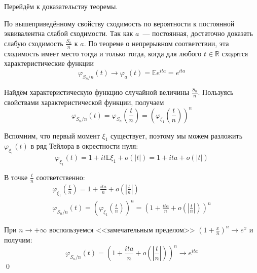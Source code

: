 \documentclass[oneside,final,14pt]{extreport}
\renewenvironment{proof}{{\bfseries Доказательство.}}{\qed}
\theoremstyle{plain}
\theoremstyle{definition}
\theoremstyle{named}
\begin{document}
Перейдём к доказательству теоремы.

\begin{proof}
    По вышеприведённому свойству сходимость по вероятности к постоянной эквивалентна слабой сходимости. Так как $a$~--- постоянная, достаточно доказать слабую сходимость $\frac{S_{n}}{n}$ к $a$. По теореме о непрерывном соответствии, эта сходимость имеет место тогда и только тогда, когда для любого $t \in \mathbb{R}$ сходятся характеристические функции
    \begin{equation*}
        \varphi_{S_{n} / n}(t) \rightarrow \varphi_{a}(t)=\mathbb{E} e^{i t a}=e^{i t a}
    \end{equation*}
    
    Найдём характеристическую функцию случайной величины $\frac{S_{n}}{n}$. Пользуясь свойствами характеристической функции, получаем
    \begin{equation*}
        \varphi_{S_{n} / n}(t)=\varphi_{S_{n}}\left(\frac{t}{n}\right)=\left(\varphi_{\xi_{1}}\left(\frac{t}{n}\right)\right)^{n}
    \end{equation*}
    
    Вспомним, что первый момент $\xi_{1}$ существует, поэтому мы можем разложить $\varphi_{\xi_{1}}(t)$ в ряд Тейлора в окрестности нуля:
    \begin{equation*}
        \varphi_{\xi_{1}}(t)=1+i t \mathbb{E} \xi_{1}+o(|t|)=1+i t a+o(|t|)
    \end{equation*}
    
    В точке $\frac{t}{n}$ соответственно:
    \begin{gather*}
        \varphi_{\xi_{1}}\left(\frac{t}{n}\right)=1+\frac{i t a}{n}+o\left(\left|\frac{t}{n}\right|\right) \\
        \varphi_{S_{n} / n}(t)=\left(\varphi_{\xi_{1}}\left(\frac{t}{n}\right)\right)^{n}=\left(1+\frac{i t a}{n}+o\left(\left|\frac{t}{n}\right|\right)\right)^{n}
    \end{gather*}
    
    При $n \to +\infty$ воспользуемся <<замечательным пределом>> $\left(1+\frac{x}{n}\right)^{n} \rightarrow e^{x}$ и получим:
    \begin{equation*}
        \varphi_{S_{n} / n}(t)=\left(1+\frac{i t a}{n}+o\left(\left|\frac{t}{n}\right|\right)\right)^{n} \rightarrow e^{i t a}
    \end{equation*}
\end{proof}
\end{document}

